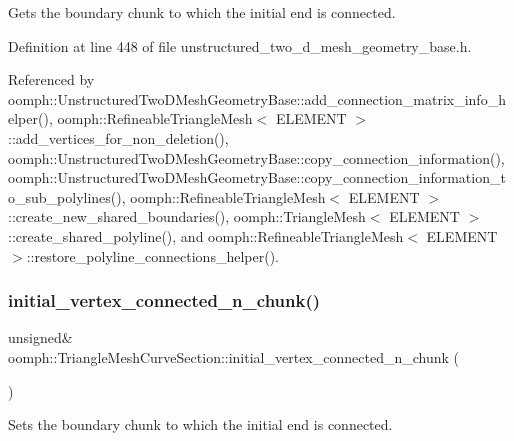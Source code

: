 Gets the boundary chunk to which the initial end is connected. 



Definition at line 448 of file unstructured\+\_\+two\+\_\+d\+\_\+mesh\+\_\+geometry\+\_\+base.\+h.



Referenced by oomph\+::\+Unstructured\+Two\+D\+Mesh\+Geometry\+Base\+::add\+\_\+connection\+\_\+matrix\+\_\+info\+\_\+helper(), oomph\+::\+Refineable\+Triangle\+Mesh$<$ E\+L\+E\+M\+E\+N\+T $>$\+::add\+\_\+vertices\+\_\+for\+\_\+non\+\_\+deletion(), oomph\+::\+Unstructured\+Two\+D\+Mesh\+Geometry\+Base\+::copy\+\_\+connection\+\_\+information(), oomph\+::\+Unstructured\+Two\+D\+Mesh\+Geometry\+Base\+::copy\+\_\+connection\+\_\+information\+\_\+to\+\_\+sub\+\_\+polylines(), oomph\+::\+Refineable\+Triangle\+Mesh$<$ E\+L\+E\+M\+E\+N\+T $>$\+::create\+\_\+new\+\_\+shared\+\_\+boundaries(), oomph\+::\+Triangle\+Mesh$<$ E\+L\+E\+M\+E\+N\+T $>$\+::create\+\_\+shared\+\_\+polyline(), and oomph\+::\+Refineable\+Triangle\+Mesh$<$ E\+L\+E\+M\+E\+N\+T $>$\+::restore\+\_\+polyline\+\_\+connections\+\_\+helper().

\mbox{\label{classoomph_1_1TriangleMeshCurveSection_a9dd1f7bcd31629354a6c59fd0479b189}} 
\subsubsection{\texorpdfstring{initial\+\_\+vertex\+\_\+connected\+\_\+n\+\_\+chunk()}{initial\_vertex\_connected\_n\_chunk()}\hspace{0.1cm}{\footnotesize\ttfamily [2/2]}}
{\footnotesize\ttfamily unsigned\& oomph\+::\+Triangle\+Mesh\+Curve\+Section\+::initial\+\_\+vertex\+\_\+connected\+\_\+n\+\_\+chunk (\begin{DoxyParamCaption}{ }\end{DoxyParamCaption})\hspace{0.3cm}{\ttfamily [inline]}}



Sets the boundary chunk to which the initial end is connected. 



